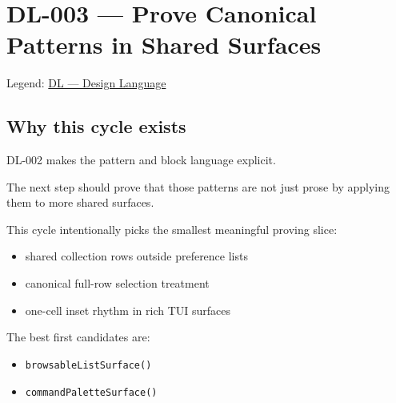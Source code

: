 \chapter{DL-003 --- Prove Canonical Patterns in Shared Surfaces}\label{record-170}

\smallskip

Legend: \href{https://github.com/flyingrobots/bijou/blob/1853ad902f6bf219326409e7f743a5a1d6517dbc/docs/legends/DL-design-language.md}{DL --- Design Language}

\section{Why this cycle exists}\label{record-170-why-this-cycle-exists}

DL-002 makes the pattern and block language explicit.

The next step should prove that those patterns are not just prose by applying them to more shared surfaces.

This cycle intentionally picks the smallest meaningful proving slice:

\begin{itemize}
\tightlist
\item
  shared collection rows outside preference lists
\item
  canonical full-row selection treatment
\item
  one-cell inset rhythm in rich TUI surfaces
\end{itemize}

The best first candidates are:

\begin{itemize}
\tightlist
\item
  \texttt{b\allowbreak{}r\allowbreak{}o\allowbreak{}w\allowbreak{}s\allowbreak{}a\allowbreak{}b\allowbreak{}l\allowbreak{}e\allowbreak{}L\allowbreak{}i\allowbreak{}s\allowbreak{}t\allowbreak{}S\allowbreak{}u\allowbreak{}r\allowbreak{}f\allowbreak{}a\allowbreak{}c\allowbreak{}e\allowbreak{}(\allowbreak{})}
\item
  \texttt{c\allowbreak{}o\allowbreak{}m\allowbreak{}m\allowbreak{}a\allowbreak{}n\allowbreak{}d\allowbreak{}P\allowbreak{}a\allowbreak{}l\allowbreak{}e\allowbreak{}t\allowbreak{}t\allowbreak{}e\allowbreak{}S\allowbreak{}u\allowbreak{}r\allowbreak{}f\allowbreak{}a\allowbreak{}c\allowbreak{}e\allowbreak{}(\allowbreak{})}
\end{itemize}


